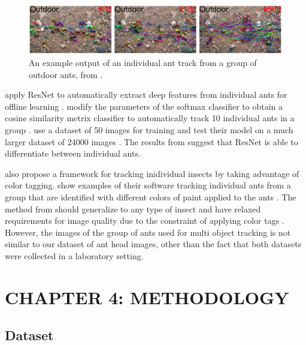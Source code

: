 \documentclass[12pt]{article}
\begin{document}
\begin{figure}[h]
    \centering
    \includegraphics[width=1\textwidth]{assets/images/ant_tracking_outdoors.png}
    \caption{An example output of an individual ant track from a group of
        outdoor ants, from \citeauthor*{cao_online_2020}
        \cite{cao_online_2020}.}
    \label{fig:ant-tracking-outdoors}
\end{figure}

\citeauthor*{cao_online_2020} apply ResNet to automatically extract deep
features from individual ants for offline learning \cite{cao_online_2020}.
\citeauthor*{cao_online_2020} modify the parameters of the softmax classifier to
obtain a cosine similarity metrix classifier to automatically track 10
individual ants in a group \cite{cao_online_2020}. \citeauthor*{cao_online_2020}
use a dataset of 50 images for training and test their model on a much larger
dataset of 24000 images \cite{cao_online_2020}. The results from
\citeauthor*{cao_online_2020} suggest that ResNet is able to differentiate
between individual ants.

\citeauthor*{gal_antrax_2020} also propose a framework for tracking inidividual
insects by taking advantage of color tagging. \citeauthor*{gal_antrax_2020} show
examples of their software tracking individual ants from a group that are
identified with different colors of paint applied to the ants
\cite{gal_antrax_2020}. The method from \citeauthor*{gal_antrax_2020} should
generalize to any type of insect and have relaxed requirements for image quality
due to the constraint of applying color tags \cite{gal_antrax_2020}.  However,
the images of the group of ants used for multi object tracking is not similar to
our dataset of ant head images, other than the fact that both datasets were
collected in a laboratory setting.

\newpage
\section{CHAPTER 4: METHODOLOGY}

\subsection{Dataset}
\end{document}

